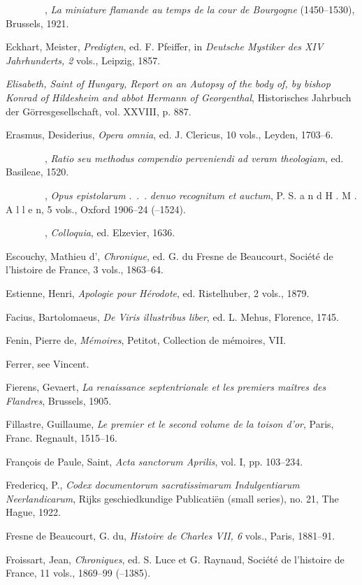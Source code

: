 {~~~~~~~~}, \emph{La miniature flamande au temps de la cour de
Bourgogne} (1450--1530), Brussels, 1921.

Eckhart, Meister, \emph{Predigten}, ed. F. Pfeiffer, in \emph{Deutsche
Mystiker des XIV Jahrhunderts, 2} vols., Leipzig, 1857.

\emph{Elisabeth, Saint of Hungary, Report on an Autopsy of the body of,
by bishop Konrad of Hildesheim and abbot Hermann of Georgenthal},
Historisches Jahrbuch der Görresgesellschaft, vol. XXVIII, p. 887.

\protect\hypertarget{24_BIBLIOGRAPHY.xhtmlux5cux23page_444}{}{}Erasmus,
Desiderius, \emph{Opera omnia}, ed. J. Clericus, 10 vols., Leyden,
1703--6.

{~~~~~~~~}, \emph{Ratio seu methodus compendio perveniendi ad veram
theologiam}, ed. Basileae, 1520.

{~~~~~~~~}, \emph{Opus epistolarum} .~.~. \emph{denuo recognitum et
auctum}, P. S. a n d H . M . A l l e n, 5 vols., Oxford 1906--24
(--1524).

{~~~~~~~~}, \emph{Colloquia}, ed. Elzevier, 1636.

Escouchy, Mathieu d', \emph{Chronique}, ed. G. du Fresne de Beaucourt,
Société de l'histoire de France, 3 vols., 1863--64.

Estienne, Henri, \emph{Apologie pour Hérodote}, ed. Ristelhuber, 2
vols., 1879.

Facius, Bartolomaeus, \emph{De Viris illustribus liber}, ed. L. Mehus,
Florence, 1745.

Fenin, Pierre de, \emph{Mémoires}, Petitot, Collection de mémoires, VII.

Ferrer, see Vincent.

Fierens, Gevaert, \emph{La renaissance septentrionale et les premiers
maîtres des Flandres}, Brussels, 1905.

Fillastre, Guillaume, \emph{Le premier et le second volume de la toison
d'or}, Paris, Franc. Regnault, 1515--16.

François de Paule, Saint, \emph{Acta sanctorum Aprilis}, vol. I, pp.
103--234.

Fredericq, P., \emph{Codex documentorum sacratissimarum Indulgentiarum
Neerlandicarum}, Rijks geschiedkundige Publicatiën (small series), no.
21, The Hague, 1922.

Fresne de Beaucourt, G. du, \emph{Histoire de Charles VII, 6} vols.,
Paris, 1881--91.

Froissart, Jean, \emph{Chroniques}, ed. S. Luce et G. Raynaud, Société
de l'histoire de France, 11 vols., 1869--99 (--1385).

